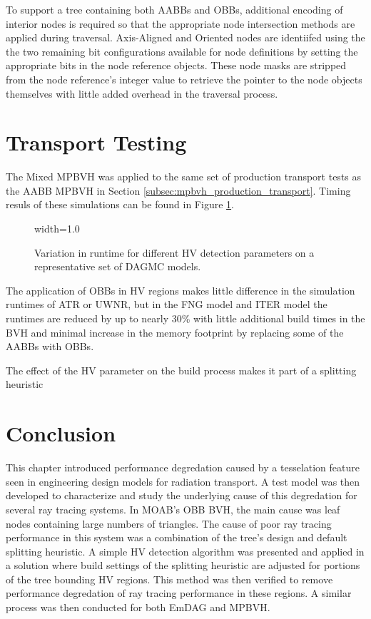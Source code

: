 To support a tree containing both AABBs and OBBs, additional encoding of
interior nodes is required so that the appropriate node intersection methods are
applied during traversal. Axis-Aligned and Oriented nodes are identiifed using
the the two remaining bit configurations available for node definitions by
setting the appropriate bits in the node reference objects. These node masks are
stripped from the node reference's integer value to retrieve the pointer to the
node objects themselves with little added overhead in the traversal process.

\section{Transport Testing}

The Mixed MPBVH was applied to the same set of production transport tests as the
AABB MPBVH in Section \ref{subsec:mpbvh_production_transport}. Timing resuls of
these simulations can be found in Figure \ref{fig:hv_parameter_study_simd}.

\begin{figure}[H]
  \centering
  {width=1.0\textwidth}
  \caption{Variation in runtime for different HV detection parameters on a
    representative set of DAGMC models.}
  \label{fig:hv_parameter_study_simd}
\end{figure}

The application of OBBs in HV regions makes little difference in the simulation
runtimes of ATR or UWNR, but in the FNG model and ITER model the runtimes are
reduced by up to nearly 30\% with little additional build times in the BVH and
minimal increase in the memory footprint by replacing some of the AABBs with
OBBs.

The effect of the HV parameter on the build process makes it part of a splitting heuristic

\section{Conclusion}

This chapter introduced performance degredation caused by a tesselation feature
seen in engineering design models for radiation transport. A test model was then
developed to characterize and study the underlying cause of this degredation for
several ray tracing systems. In MOAB's OBB BVH, the main cause was leaf nodes
containing large numbers of triangles. The cause of poor ray tracing performance
in this system was a combination of the tree's design and default splitting
heuristic. A simple HV detection algorithm was presented and applied in a
solution where build settings of the splitting heuristic are adjusted for
portions of the tree bounding HV regions. This method was then verified to
remove performance degredation of ray tracing performance in these regions. A
similar process was then conducted for both EmDAG and MPBVH.


